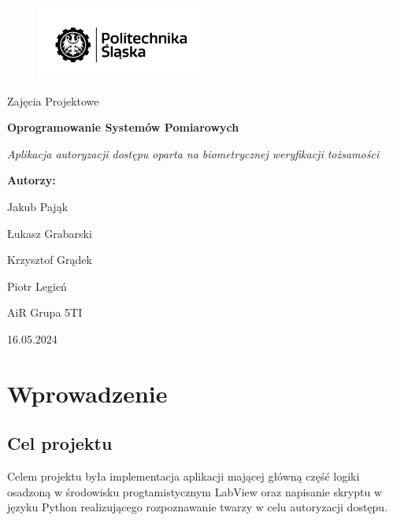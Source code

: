 \documentclass{report}
\begin{document}
\begin{titlepage}
    \centering
    \vspace*{1cm}
    \begin{figure}
        \centering 
        \includegraphics[width=0.5\textwidth]{"logo.png"}
    \end{figure}
    \Huge
    Zajęcia Projektowe
    \par
    \textbf{Oprogramowanie Systemów Pomiarowych}
    
    \vspace*{1cm}

    \vspace{0.5cm}
    \LARGE \textit{Aplikacja autoryzacji dostępu oparta 
    na biometrycznej weryfikacji tożsamości}
    
    \vspace{1.5cm}
    
    \textbf{Autorzy:} 
    \par
    Jakub Pająk 
    \par
    Łukasz Grabarski
    \par 
    Krzysztof Grądek
    \par 
    Piotr Legień
    \vspace*{1.5cm}
    \par AiR Grupa 5TI
    
    \vfill
    
    \Large 16.05.2024
    
\end{titlepage}


\newpage

\tableofcontents

\newpage


\section{\LARGE Wprowadzenie}
\subsection{\Large Cel projektu}
Celem projektu była implementacja aplikacji mającej główną część logiki osadzoną w środowisku progtamistycznym 
LabView oraz napisanie skryptu w języku Python realizującego rozpoznawanie twarzy w celu autoryzacji dostępu. 
\end{document}
